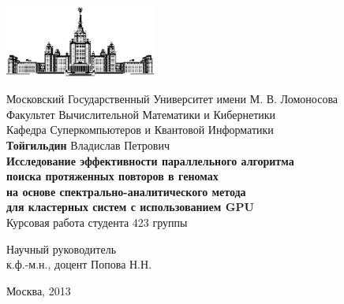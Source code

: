 \begin{titlepage}
\begin{center}

    \includegraphics[width=50mm]{image/msu4.eps}

    \bigskip
    Московский Государственный Университет имени М. В. Ломоносова\\
    Факультет Вычислительной Математики и Кибернетики\\

    \bigskip
    Кафедра Суперкомпьютеров и Квантовой Информатики\\[10mm]

    \large
    {{\bf Тойгильдин} Владислав Петрович\\}
    \bigskip
    \Large
    {\bf{Исследование эффективности параллельного алгоритма \\
        поиска протяженных повторов в геномах \\
        на основе спектрально-аналитического метода \\
        для кластерных систем с использованием GPU \\}
    }
    \normalsize
    \bigskip
    Курсовая работа
    студента 423 группы
    \bigskip
    \bigskip
    \bigskip
    \bigskip
    \begin{flushright}
        Научный руководитель\\
        к.ф.-м.н., доцент Попова Н.Н.
    \end{flushright}
    \vspace{\fill}
    Москва, 2013
\end{center}
\end{titlepage}
\setcounter{page}{2}
